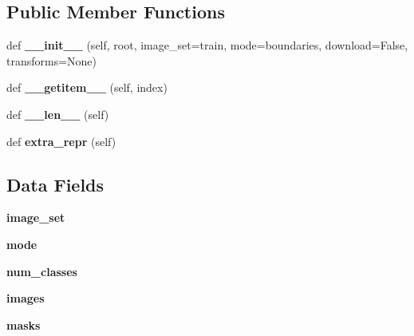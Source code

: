 \subsection*{Public Member Functions}
\begin{DoxyCompactItemize}
\item 
\mbox{\label{classtorchvision_1_1datasets_1_1sbd_1_1SBDataset_a8d25e4094ecd4d5ba455605afd52e8e5}} 
def {\bfseries \+\_\+\+\_\+init\+\_\+\+\_\+} (self, root, image\+\_\+set=\textquotesingle{}train\textquotesingle{}, mode=\textquotesingle{}boundaries\textquotesingle{}, download=False, transforms=None)
\item 
\mbox{\label{classtorchvision_1_1datasets_1_1sbd_1_1SBDataset_a21e18bb60168bbc3d47ad8ce12170acf}} 
def {\bfseries \+\_\+\+\_\+getitem\+\_\+\+\_\+} (self, index)
\item 
\mbox{\label{classtorchvision_1_1datasets_1_1sbd_1_1SBDataset_a40a0783ec86deb01a2fc3a015a8ca6bd}} 
def {\bfseries \+\_\+\+\_\+len\+\_\+\+\_\+} (self)
\item 
\mbox{\label{classtorchvision_1_1datasets_1_1sbd_1_1SBDataset_a95e307cf8b6617854be52aba6c6b5a8d}} 
def {\bfseries extra\+\_\+repr} (self)
\end{DoxyCompactItemize}
\subsection*{Data Fields}
\begin{DoxyCompactItemize}
\item 
\mbox{\label{classtorchvision_1_1datasets_1_1sbd_1_1SBDataset_aba43cdefe63eb965439d3529e8a44f05}} 
{\bfseries image\+\_\+set}
\item 
\mbox{\label{classtorchvision_1_1datasets_1_1sbd_1_1SBDataset_af108bef4fa2029ad112d2bdcaa2751a9}} 
{\bfseries mode}
\item 
\mbox{\label{classtorchvision_1_1datasets_1_1sbd_1_1SBDataset_a8e72302efa558e3cf3b1ea7643d3a468}} 
{\bfseries num\+\_\+classes}
\item 
\mbox{\label{classtorchvision_1_1datasets_1_1sbd_1_1SBDataset_a86d2a73e7a375813b69c6216ff172a20}} 
{\bfseries images}
\item 
\mbox{\label{classtorchvision_1_1datasets_1_1sbd_1_1SBDataset_a66d5767d6daf41688630662313163b00}} 
{\bfseries masks}
\end{DoxyCompactItemize}
